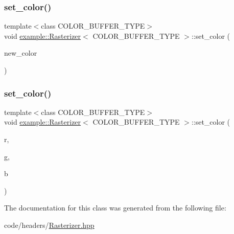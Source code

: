 \mbox{\label{classexample_1_1_rasterizer_a6770b1e636262a2977ee2ccca726b134}} 
\subsubsection{\texorpdfstring{set\_color()}{set\_color()}\hspace{0.1cm}{\footnotesize\ttfamily [1/2]}}
{\footnotesize\ttfamily template$<$class C\+O\+L\+O\+R\+\_\+\+B\+U\+F\+F\+E\+R\+\_\+\+T\+Y\+PE$>$ \\
void \mbox{\hyperlink{classexample_1_1_rasterizer}{example\+::\+Rasterizer}}$<$ C\+O\+L\+O\+R\+\_\+\+B\+U\+F\+F\+E\+R\+\_\+\+T\+Y\+PE $>$\+::set\+\_\+color (\begin{DoxyParamCaption}\item[{const \mbox{\hyperlink{classexample_1_1_rasterizer_aabfa22a5aef17d16a0cfb362fa30e69b}{Color}} \&}]{new\+\_\+color }\end{DoxyParamCaption})\hspace{0.3cm}{\ttfamily [inline]}}

\mbox{\label{classexample_1_1_rasterizer_a0043c4af15566e7f0463a22c04c67812}} 
\subsubsection{\texorpdfstring{set\_color()}{set\_color()}\hspace{0.1cm}{\footnotesize\ttfamily [2/2]}}
{\footnotesize\ttfamily template$<$class C\+O\+L\+O\+R\+\_\+\+B\+U\+F\+F\+E\+R\+\_\+\+T\+Y\+PE$>$ \\
void \mbox{\hyperlink{classexample_1_1_rasterizer}{example\+::\+Rasterizer}}$<$ C\+O\+L\+O\+R\+\_\+\+B\+U\+F\+F\+E\+R\+\_\+\+T\+Y\+PE $>$\+::set\+\_\+color (\begin{DoxyParamCaption}\item[{int}]{r,  }\item[{int}]{g,  }\item[{int}]{b }\end{DoxyParamCaption})\hspace{0.3cm}{\ttfamily [inline]}}



The documentation for this class was generated from the following file\+:\begin{DoxyCompactItemize}
\item 
code/headers/\mbox{\hyperlink{_rasterizer_8hpp}{Rasterizer.\+hpp}}\end{DoxyCompactItemize}
